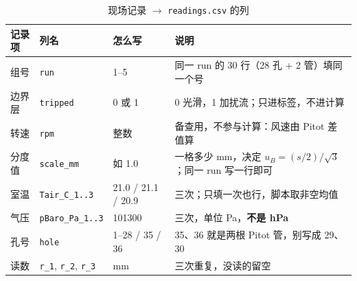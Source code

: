 \documentclass[11pt,a4paper]{ctexart}
\begin{document}
\begin{table}[H]
\centering
\caption{现场记录 $\rightarrow$ \texttt{readings.csv} 的列}
\small
\begin{tabularx}{\textwidth}{@{}p{3.1cm} p{3.5cm} p{2.6cm} X@{}}
\toprule
记录项 & 列名 & 怎么写 & 说明 \\
\midrule
组号 & \texttt{run} & 1--5 & 同一 run 的 30 行（28 孔 + 2 管）填同一个号 \\
边界层 & \texttt{tripped} & 0 或 1 & 0 光滑，1 加扰流；只进标签，不进计算 \\
转速 & \texttt{rpm} & 整数 & 备查用，不参与计算：风速由 Pitot 差值算 \\
分度值 & \texttt{scale\_mm} & 如 1.0 & 一格多少 mm，决定 $u_B=(s/2)/\sqrt{3}$；同一 run 写一行即可 \\
室温 & \texttt{Tair\_C\_1..3} & 21.0 / 21.1 / 20.9 & 三次；只填一次也行，脚本取非空均值 \\
气压 & \texttt{pBaro\_Pa\_1..3} & 101300 & 三次，单位 Pa，\textbf{不是 hPa} \\
孔号 & \texttt{hole} & 1--28 / 35 / 36 & 35、36 就是两根 Pitot 管，别写成 29、30 \\
读数 & \texttt{r\_1}, \texttt{r\_2}, \texttt{r\_3} & mm & 三次重复，没读的留空 \\
\bottomrule
\end{tabularx}
\end{table}
\end{document}
